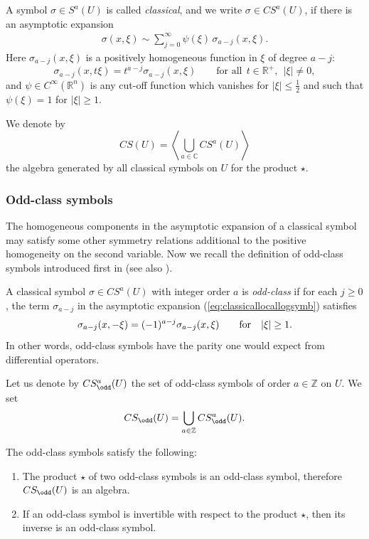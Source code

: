 A symbol $ \sigma\in S^a(U)$ is called  {\it classical}, and we write $\sigma\in CS^a(U)$, if there is an asymptotic expansion
\begin{gather}
\sigma(x,\xi) \sim \sum_{j=0}^{\infty}\psi(\xi)\, \sigma_{a-j}(x,\xi). \label{eq:classicallocallogsymb}
\end{gather}
Here $\sigma_{a-j}(x,\xi)$ is a positively homogeneous function in $\xi$ of degree $a-j$:
\[
\sigma_{a-j}(x,t\xi)=t^{a-j}\sigma_{a-j}(x,\xi) \qquad \text{for all}  \ \ t\in\mathbb{R}^+, \ \ \vert \xi\vert \not=0,
\]
and $\psi\in C^{\infty}(\mathbb{R}^n)$ is any cut-of\/f function which vanishes for $\vert \xi \vert \leq \frac{1}{2}$ and such that $\psi(\xi)=1$ for $\vert \xi\vert \geq 1$.

We denote by
\[
CS(U)=\left\langle \bigcup_{a\in \mathbb{C}} CS^a(U)\right\rangle
\]
the algebra generated by all classical symbols on $U$ for the product $\star$.

\subsubsection{Odd-class symbols}

The homogeneous components in the asymptotic expansion of a classical symbol may satisfy some other symmetry relations additional to the positive homogeneity on the second variable. Now we recall the def\/inition of odd-class symbols introduced f\/irst in \cite{kontsevichdeterminant} (see also \cite{grubb}).

\begin{definition}
A classical symbol $\sigma\in {CS}^{a}(U)$ with integer order $a$ is \emph{odd-class} if for each $j\geq 0$, the term $\sigma_{a-j}$ in the asymptotic expansion (\ref{eq:classicallocallogsymb}) satisf\/ies
\begin{gather}
\sigma_{a-j}(x,-\xi)=(-1)^{a-j}\sigma_{a-j}(x,\xi) \qquad {\rm for}\quad \vert \xi\vert \geq 1. \label{eq:OddlogPolyhom}
\end{gather}
In other words, odd-class symbols have the parity one would expect from dif\/ferential operators.
\end{definition}
Let us denote by $CS_{\odd}^a(U)$ the set of odd-class symbols of order $a\in \mathbb{Z}$ on $U$. We set
\[
CS_{\odd}(U)=\bigcup_{a\in \mathbb{Z}} CS_{\odd}^a(U).
\]

\begin{lemma}\label{lemmaoddclasssymbols}
The odd-class symbols satisfy the following:
\begin{enumerate}\itemsep=0pt
\item The product $\star$ of two odd-class symbols is an odd-class symbol, therefore $CS_{\odd}(U)$ is an algebra.
\item If an odd-class symbol is invertible with respect to the product $\star$, then its inverse is an odd-class symbol.
\end{enumerate}
\end{lemma}

